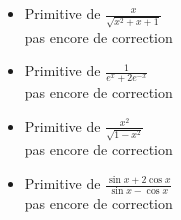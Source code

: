 \begin{itemize}
 
 \item Primitive de $\frac{x}{\sqrt{x^2+x+1}} $\\pas encore de correction
 \item Primitive de $\frac{1}{e^x+2e^{-x}} $\\pas encore de correction
 \item Primitive de $\frac{x^2}{\sqrt{1-x^2}} $\\pas encore de correction
 \item Primitive de $\frac{\sin x +2\cos x}{\sin x -\cos x} $\\pas encore de correction
\end{itemize}
